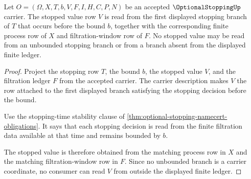 \begin{theorem}
\label{thm:optional-stopping-bounded-stopped-value-readback}
Let $O=(\Omega,X,T,b,V,F,I,H,C,P,N)$ be an accepted $\OptionalStoppingUp$ carrier. The stopped value row $V$ is read from the first displayed stopping branch of $T$ that occurs before the bound $b$, together with the corresponding finite process row of $X$ and filtration-window row of $F$. No stopped value may be read from an unbounded stopping branch or from a branch absent from the displayed finite ledger.
\end{theorem}
\begin{proof}
Project the stopping row $T$, the bound $b$, the stopped value $V$, and the filtration ledger $F$ from the accepted carrier. The carrier description makes $V$ the row attached to the first displayed branch satisfying the stopping decision before the bound.

Use the stopping-time stability clause of \autoref{thm:optional-stopping-namecert-obligations}. It says that each stopping decision is read from the finite filtration data available at that time and remains bounded by $b$.

The stopped value is therefore obtained from the matching process row in $X$ and the matching filtration-window row in $F$. Since no unbounded branch is a carrier coordinate, no consumer can read $V$ from outside the displayed finite ledger.
\end{proof}

